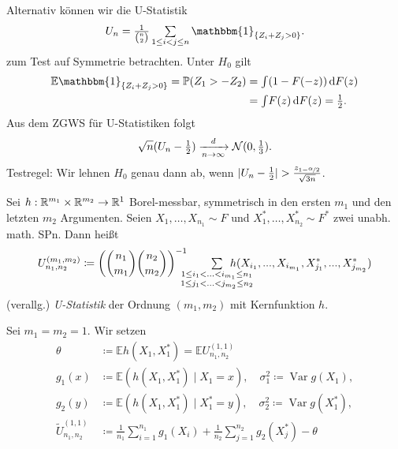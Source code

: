 \documentclass{cheat-sheet}
\renewcommand{\P}{\mathbb{P}} %
\newcommand{\E}{\mathbb{E}} %
\newcommand{\ind}{\mathbbm{1}} %
\DeclareMathOperator{\var}{Var} %
\newcommand{\Normal}{\mathcal{N}} %
\begin{document}
\begin{bsp}
  Alternativ können wir die U-Statistik
  \[
    U_n = \tfrac{1}{\binom{n}{2}} \sum_{1 \leq i < j \leq n} \ind_{\{ Z_i + Z_j > 0 \}}.
  \]
  zum Test auf Symmetrie betrachten.
  Unter $H_0$ gilt
  \begin{align*}
    \E \ind_{\{ Z_i + Z_j > 0 \}}
    = \P(Z_1 > - Z_2)
    & = \IInt{(1 - F(-z))}{F(z)} \\
    & = \IInt{F(z)}{F(z)}
    = \tfrac{1}{2}.
  \end{align*}
  Aus dem ZGWS für U-Statistiken folgt
  \[
    \sqrt{n} (U_n - \tfrac{1}{2}) \xra[n \to \infty]{d} \Normal(0, \tfrac{1}{3}).
  \]
  Testregel: Wir lehnen $H_0$ genau dann ab, wenn \enspace
  $\lvert U_n - \tfrac{1}{2}\rvert > \tfrac{z_{1 - \nicefrac{\alpha}{2}}}{\sqrt{3n}}$.
\end{bsp}



\begin{defn}
  Sei $h : \mathbb{R}^{m_1} \times \mathbb{R}^{m_2} \to \mathbb{R}^1$ Borel-messbar, symmetrisch in den ersten $m_1$ und den letzten $m_2$ Argumenten.
  Seien $X_1, \ldots, X_{n_1} \sim F$ und $X_1^*, \ldots, X_{n_2}^* \sim F^*$ zwei unabh. math. SPn.
  Dann heißt
  \[
    U_{n_1, n_2}^{(m_1, m_2)} \coloneqq \left( \binom{n_1}{m_1} \binom{n_2}{m_2} \right)^{-1} \qquad
    \sum_{\mathclap{\substack{1 \leq i_1 < \ldots < i_{m_1} \leq n_1 \\ 1 \leq j_1 < \ldots < j_{m_2} \leq n_2}}} \enspace
    h(X_{i_1}, \nldots, X_{i_{m_1}}, X_{j_1}^*, \nldots, X_{j_{m_2}}^*)
  \]
  (verallg.) \emph{U-Statistik} der Ordnung $(m_1, m_2)$ mit Kernfunktion $h$.
\end{defn}

\begin{nota}
  Sei $m_1 = m_2 = 1$.
  Wir setzen
  \begin{align*}
    \theta & \coloneqq \E h(X_1, X_1^*) = \E U_{n_1, n_2}^{(1, 1)} \\
    g_1(x) & \coloneqq \E( h(X_1, X_1^*) \mid X_1 = x), \quad
    \sigma_1^2 \coloneqq \var g(X_1), \\
    g_2(y) & \coloneqq \E( h(X_1, X_1^*) \mid X_1^* = y), \quad
    \sigma_2^2 \coloneqq \var g(X_1^*), \\
    \tilde{U}_{n_1, n_2}^{(1,1)} & \coloneqq \tfrac{1}{n_1} \sum_{i=1}^{n_1} g_1(X_i) + \tfrac{1}{n_2} \sum_{j=1}^{n_2} g_2(X_j^*) - \theta
  \end{align*}
\end{nota}
\end{document}
